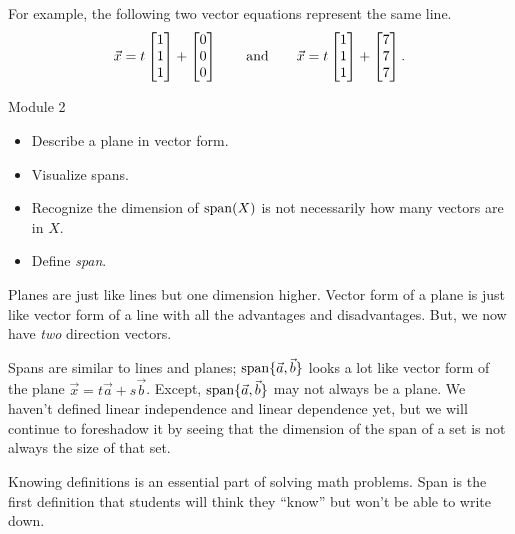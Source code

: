 \begin{parts}
\begin{solution}
				For example, the following two vector equations represent the
				same line.
				\[
					\vec x = t \mat{1\\1\\1} + \mat{0\\0\\0}
					\qquad \text{and} \qquad
					\vec x = t \mat{1\\1\\1} + \mat{7\\7\\7}.
				\]
			\end{solution}
	\end{parts}


\begin{lesson}

	Module 2

	\begin{itemize}
		\item Describe a plane in vector form.
		\item Visualize spans.
		\item Recognize the dimension of $\operatorname{span}(X)$ is not necessarily how many vectors
			are in $X$.
		\item Define \emph{span}.
	\end{itemize}

	Planes are just like lines but one dimension higher. Vector form of a plane is just like
	vector form of a line with all the advantages and disadvantages. But, we now have
	\emph{two} direction vectors.

	Spans are similar to lines and planes; $\operatorname{span}\{\vec a,\vec b\}$ looks a lot like
	vector form of the plane
	$\vec x=t\vec a+s\vec b$. Except, $\operatorname{span}\{\vec a,\vec b\}$ may not always be a plane.
	We haven't defined linear independence and linear dependence yet, but we will continue to
	foreshadow it by seeing that the dimension of the span of a set is not always the size of
	that set.

	Knowing definitions is an essential part of solving math problems. Span is
	the first definition that students will think they ``know'' but won't be
	able to write down.

\end{lesson}

	\displayonlynewpage
	\bookonlynewpage

